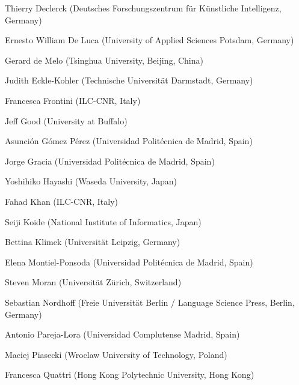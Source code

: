 \documentclass[11pt]{article}
\begin{document}
\begin{figure*}[t]
\begin{minipage}{\textwidth}
	Thierry Declerck (Deutsches Forschungszentrum für Künstliche Intelligenz, Germany)			%
	
    Ernesto William De Luca (University of Applied Sciences Potsdam, Germany)					%
	
    Gerard de Melo (Tsinghua University, Beijing, China)										%
	
    Judith Eckle-Kohler (Technische Universität Darmstadt, Germany)								%
	
    Francesca Frontini (ILC-CNR, Italy)															%
	
    Jeff Good (University at Buffalo)															%
	
    Asunción Gómez Pérez (Universidad Politécnica de Madrid, Spain)								%
	
    Jorge Gracia (Universidad Politécnica de Madrid, Spain)										%
	
	
	
    Yoshihiko Hayashi (Waseda University, Japan)												%
	
    Fahad Khan (ILC-CNR, Italy)																	%
	
    Seiji Koide (National Institute of Informatics, Japan)										%
	
    Bettina Klimek (Universität Leipzig, Germany)												%
	
	
	
	Elena Montiel-Ponsoda (Universidad Politécnica de Madrid, Spain)							%
	
    Steven Moran (Universität Zürich, Switzerland)												%
	
    Sebastian Nordhoff (Freie Universität Berlin / Language Science Press, Berlin, Germany)		%
	
	
	Antonio Pareja-Lora (Universidad Complutense Madrid, Spain)									%
	
    Maciej Piasecki (Wroclaw University of Technology, Poland)									%
	
    Francesca Quattri (Hong Kong Polytechnic University, Hong Kong)								%
	

\end{minipage}
\end{figure*}
\end{document}
